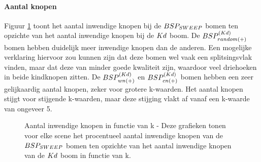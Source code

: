 \paragraph{Aantal knopen} Figuur \ref{fig:k-knopen} toont het aantal inwendige knopen bij de $BSP_{SWEEP}$ bomen ten opzichte van het aantal inwendige knopen bij de $Kd$ boom. De $BSP^{(Kd)}_{random(+)}$ bomen hebben duidelijk meer inwendige knopen dan de anderen. Een mogelijke verklaring hiervoor zou kunnen zijn dat deze bomen wel vaak een splitsingsvlak vinden, maar dat deze van minder goede kwaliteit zijn, waardoor veel driehoeken in beide kindknopen zitten. De $BSP^{(Kd)}_{wn(+)}$ en $BSP^{(Kd)}_{cn(+)}$ bomen hebben een zeer gelijkaardig aantal knopen, zeker voor grotere k-waarden. Het aantal knopen stijgt voor stijgende k-waarden, maar deze stijging vlakt af vanaf een k-waarde van ongeveer 5.
\begin{figure}[h]
  \centering
  \begin{subfigure}[t]{.32\linewidth}
    \centering
{}
  \end{subfigure}
  \begin{subfigure}[t]{.32\linewidth}
    \centering
{}
\end{subfigure}
\begin{subfigure}[t]{.32\linewidth}
  \centering
{}
\end{subfigure}
\caption[Aantal inwendige knopen in functie van k]{Aantal inwendige knopen in functie van k - \small Deze grafieken tonen voor elke scene het procentueel aantal inwendige knopen van de $BSP_{SWEEP}$ bomen ten opzichte van het aantal inwendige knopen van de $Kd$ boom in functie van k.}
\label{fig:k-knopen}
\end{figure}
